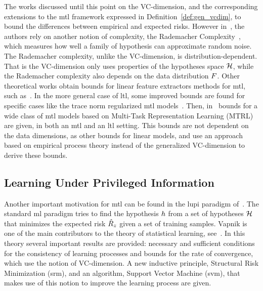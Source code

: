 %
The works discussed until this point on the VC-dimension, and the corresponding extensions to the \acrshort{mtl} framework expressed in Definition~\ref{def:gen_vcdim}, to bound the differences between empirical and expected risks.
%
However in~\cite{AndoZ05}, the authors rely on another notion  of complexity, the Rademacher Complexity~\cite{BartlettM02}, which measures how well a family of hypothesis can approximate random noise. The Rademacher complexity, unlike the VC-dimension, is distribution-dependent. That is the VC-dimension only uses properties of the hypotheses space $\mathcal{H}$, while the Rademacher complexity also depends on the data distribution $F$. 
Other theoretical works obtain bounds for linear feature extractors methods for \acrshort{mtl}, such as~\cite{CavallantiCG10,Maurer06, Maurer06rad}.
In the more general case of \acrshort{ltl}, some improved bounds are found for specific cases like the trace norm regularized \acrshort{mtl} models~\cite{MaurerPR13}.
Then, in~\cite{MaurerPR16} bounds for a wide class of \acrshort{mtl} models based on Multi-Task Representation Learning (MTRL) are given, in both an \acrshort{mtl} and an \acrshort{ltl} setting. This bounds are not dependent on the data dimensions, as other bounds for linear models, and use an approach based on empirical process theory instead of the generalized VC-dimension to derive these bounds.


\subsection{Learning Under Privileged Information}\label{subsec:ch3_lupi}
Another important motivation for \acrshort{mtl} can be found in the \acrfull{lupi} paradigm of~\cite{VapnikI15a}.
The standard \acrshort{ml} paradigm tries to find the hypothesis $h$ from a set of hypotheses $\mathcal{H}$ that minimizes the expected risk $\hat{R}_z$ given a set of training samples.
Vapnik is one of the main contributors to the theory of statistical learning, see~\cite{Vapnik00}. In this theory several important results are provided: necessary and sufficient conditions for the consistency of learning processes and bounds for the rate of convergence, which use the notion of VC-dimension. A new inductive principle, Structural Risk Minimization (\acrshort{srm}), and an algorithm, Support Vector Machine (\acrshort{svm}), that makes use of this notion to improve the learning process are given.

